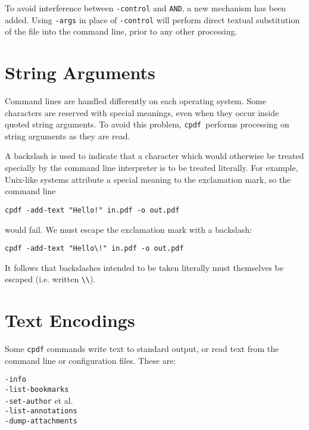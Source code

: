 \documentclass{book}
\newcommand{\cpdf}{\texttt{cpdf}}
\begin{document}
To avoid interference between \texttt{-control} and \texttt{AND}, a new mechanism has been added. Using \texttt{-args} in place of \texttt{-control} will perform direct textual substitution of the file into the command line, prior to any other processing.


\section{String Arguments}
Command lines are handled differently on each operating system. Some
characters are reserved with special meanings, even when they occur inside
quoted string arguments. To avoid this problem, \cpdf\ performs processing on
string arguments as they are read.

A backslash is used to indicate that a character which would otherwise be
treated specially by the command line interpreter is to be treated literally. For
example, Unix-like systems attribute a special meaning to the exclamation mark, so
the command line
\begin{framed}
 \small\verb?cpdf -add-text "Hello!" in.pdf -o out.pdf?
\end{framed}
\noindent would fail. We must escape the exclamation mark with a backslash:
\begin{framed}
 \small\verb?cpdf -add-text "Hello\!" in.pdf -o out.pdf?
\end{framed}
\noindent It follows that backslashes intended to be taken literally must themselves be
escaped (i.e. written \verb!\\!).

\section{Text Encodings}
\label{textencodings}

Some \texttt{cpdf} commands write text to standard output, or read text from
the command line or configuration files. These are:

\begin{framed}
  \noindent\small\verb!-info!\\
  \noindent\small\verb!-list-bookmarks!\\
  \noindent\small\verb!-set-author! et al.\\
  \noindent\small\verb!-list-annotations!\\
  \noindent\small\verb!-dump-attachments!
\end{framed}
\end{document}
